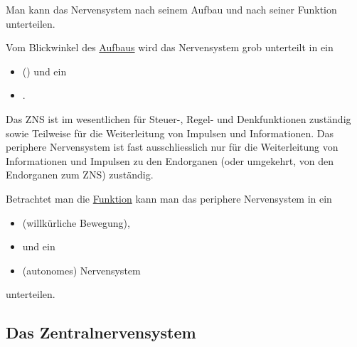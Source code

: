 Man kann das Nervensystem nach seinem Aufbau und nach seiner Funktion
unterteilen.

Vom Blickwinkel des \underline{Aufbaus} wird das Nervensystem grob
unterteilt in ein


\begin{itemize}
\item {} () und ein 
\item {}.
\end{itemize}

Das ZNS ist im wesentlichen f\"ur Steuer-, Regel- und Denkfunktionen
zust\"andig sowie Teilweise f\"ur die Weiterleitung von Impulsen und
Informationen. Das periphere Nervensystem ist fast ausschliesslich nur
f\"ur die Weiterleitung von Informationen und Impulsen zu den
Endorganen (oder umgekehrt, von den Endorganen zum ZNS) zust\"andig. 

Betrachtet man die \underline{Funktion} kann man das
periphere Nervensystem in ein

\begin{itemize}
\item {} (willk\"urliche Bewegung),
\item {} und ein
\item {} (autonomes) Nervensystem
\end{itemize}

unterteilen. 

\subsection{Das Zentralnervensystem}


